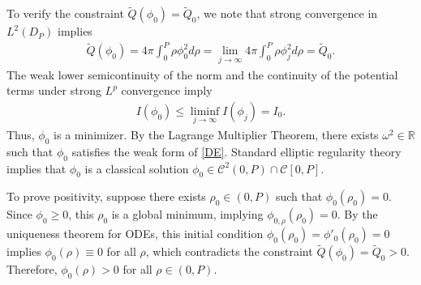 \documentclass[12pt]{article}
\begin{document}
	To verify the constraint $\tilde{Q}(\phi_0) = \tilde{Q}_0$, we note that strong convergence in $L^2(D_P)$ implies
	\begin{align}
		\tilde{Q}(\phi_0) = 4\pi \int_0^P \rho \phi_0^2 d\rho = \lim_{j\to\infty} 4\pi \int_0^P \rho \phi_j^2 d\rho = \tilde{Q}_0.
	\end{align}
	The weak lower semicontinuity of the norm and the continuity of the potential terms under strong $L^p$ convergence imply
	\begin{align}
		I(\phi_0) \leq \liminf_{j\to\infty} I(\phi_j) = I_0.
	\end{align}
	Thus, $\phi_0$ is a minimizer. By the Lagrange Multiplier Theorem, there exists $\omega^2 \in \mathbb{R}$ such that $\phi_0$ satisfies the weak form of \eqref{DE}. Standard elliptic regularity theory implies that $\phi_0$ is a classical solution $\phi_0 \in \mathcal{C}^2(0, P) \cap \mathcal{C}[0, P]$.
	
	To prove positivity, suppose there exists $\rho_0 \in (0, P)$ such that $\phi_0(\rho_0) = 0$. Since $\phi_0 \geq 0$, this $\rho_0$ is a global minimum, implying $\phi_{0,\rho}(\rho_0) = 0$. By the uniqueness theorem for ODEs, this initial condition $\phi_0(\rho_0) = \phi'_{0}(\rho_0) = 0$ implies $\phi_0(\rho) \equiv 0$ for all $\rho$, which contradicts the constraint $\tilde{Q}(\phi_0) = \tilde{Q}_0 > 0$. Therefore, $\phi_0(\rho) > 0$ for all $\rho \in (0, P)$.
	
\end{document}
